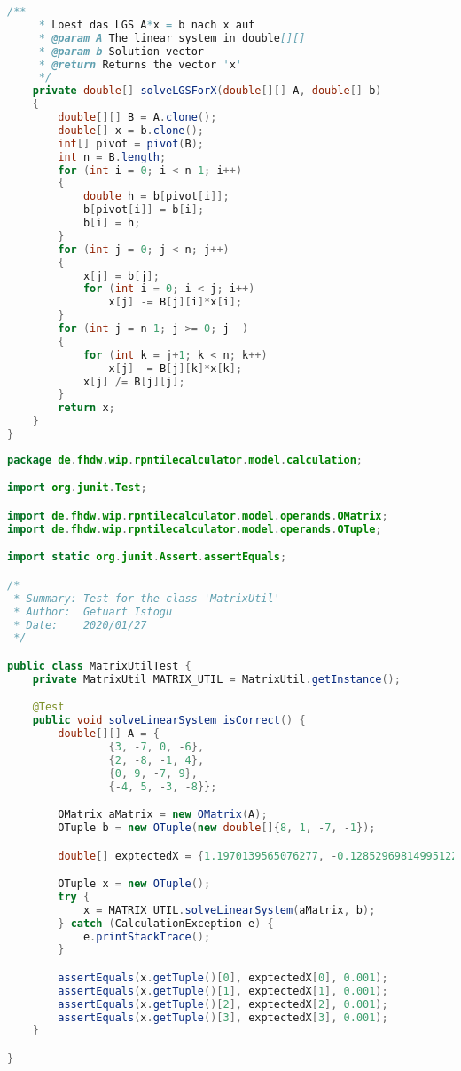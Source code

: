 \begin{lstlisting}[caption=MatrixUtil (Istogu),label=list:MatrixUtil,language=Java]
    /**
     * Loest das LGS A*x = b nach x auf
     * @param A The linear system in double[][]
     * @param b Solution vector
     * @return Returns the vector 'x'
     */
    private double[] solveLGSForX(double[][] A, double[] b)
    {
        double[][] B = A.clone();
        double[] x = b.clone();
        int[] pivot = pivot(B);
        int n = B.length;
        for (int i = 0; i < n-1; i++)
        {
            double h = b[pivot[i]];
            b[pivot[i]] = b[i];
            b[i] = h;
        }
        for (int j = 0; j < n; j++)
        {
            x[j] = b[j];
            for (int i = 0; i < j; i++)
                x[j] -= B[j][i]*x[i];
        }
        for (int j = n-1; j >= 0; j--)
        {
            for (int k = j+1; k < n; k++)
                x[j] -= B[j][k]*x[k];
            x[j] /= B[j][j];
        }
        return x;
    }
}
\end{lstlisting}    

\begin{lstlisting}[caption=MatrixUtilTest (Istogu), label=list:MatrixUtilTest, language=Java]
package de.fhdw.wip.rpntilecalculator.model.calculation;

import org.junit.Test;

import de.fhdw.wip.rpntilecalculator.model.operands.OMatrix;
import de.fhdw.wip.rpntilecalculator.model.operands.OTuple;

import static org.junit.Assert.assertEquals;

/*
 * Summary: Test for the class 'MatrixUtil'
 * Author:  Getuart Istogu
 * Date:    2020/01/27
 */

public class MatrixUtilTest {
    private MatrixUtil MATRIX_UTIL = MatrixUtil.getInstance();

    @Test
    public void solveLinearSystem_isCorrect() {
        double[][] A = {
                {3, -7, 0, -6},
                {2, -8, -1, 4},
                {0, 9, -7, 9},
                {-4, 5, -3, -8}};

        OMatrix aMatrix = new OMatrix(A);
        OTuple b = new OTuple(new double[]{8, 1, -7, -1});

        double[] exptectedX = {1.1970139565076277, -0.12852969814995122, 0.08276533592989294, -0.5848750405712432};

        OTuple x = new OTuple();
        try {
            x = MATRIX_UTIL.solveLinearSystem(aMatrix, b);
        } catch (CalculationException e) {
            e.printStackTrace();
        }

        assertEquals(x.getTuple()[0], exptectedX[0], 0.001);
        assertEquals(x.getTuple()[1], exptectedX[1], 0.001);
        assertEquals(x.getTuple()[2], exptectedX[2], 0.001);
        assertEquals(x.getTuple()[3], exptectedX[3], 0.001);
    }

}
\end{lstlisting}

